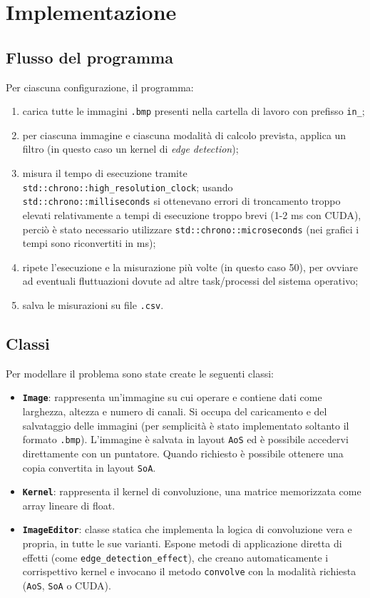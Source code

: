 \documentclass{article}
\newcommand{\code}[1]{\texttt{#1}}
\begin{document}
\section{Implementazione}

\subsection{Flusso del programma}
Per ciascuna configurazione, il programma:
\begin{enumerate}
    \item carica tutte le immagini \code{.bmp} presenti nella cartella di lavoro con prefisso \code{in\_};
    \item per ciascuna immagine e ciascuna modalità di calcolo prevista, applica un filtro (in questo caso un kernel di \textit{edge detection});
    \item misura il tempo di esecuzione tramite \code{std::chrono::high\_resolution\_clock}; usando \\ \code{std::chrono::milliseconds} si ottenevano errori di troncamento troppo elevati relativamente a tempi di esecuzione troppo brevi (1-2 ms con CUDA), perciò è stato necessario utilizzare \code{std::chrono::microseconds} (nei grafici i tempi sono riconvertiti in ms);
    \item ripete l'esecuzione e la misurazione più volte (in questo caso 50), per ovviare ad eventuali fluttuazioni dovute ad altre task/processi del sistema operativo;
    \item salva le misurazioni su file \code{.csv}.
\end{enumerate}

\subsection{Classi}
\label{subsec:classi}
Per modellare il problema sono state create le seguenti classi:

\begin{itemize}
    \item \textbf{\code{Image}}: rappresenta un'immagine su cui operare e contiene dati come larghezza, altezza e numero di canali. Si occupa del caricamento e del salvataggio delle immagini (per semplicità è stato implementato soltanto il formato \code{.bmp}). L'immagine è salvata in layout \code{AoS} ed è possibile accedervi direttamente con un puntatore. Quando richiesto è possibile ottenere una copia convertita in layout \code{SoA}.
    \item \textbf{\code{Kernel}}: rappresenta il kernel di convoluzione, una matrice memorizzata come array lineare di float.
    \item \textbf{\code{ImageEditor}}: classe statica che implementa la logica di convoluzione vera e propria, in tutte le sue varianti. Espone metodi di applicazione diretta di effetti (come \code{edge\_detection\_effect}), che creano automaticamente i corrispettivo kernel e invocano il metodo \code{convolve} con la modalità richiesta (\code{AoS}, \code{SoA} o CUDA).
\end{itemize}
\end{document}

